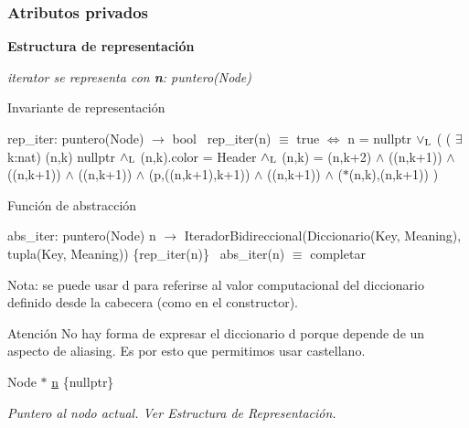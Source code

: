 \subsubsection*{Atributos privados}
\begin{Indent}{\bf Estructura de representación}\par
{\em iterator se representa con {\bfseries n}\+: puntero(\+Node)

\begin{DoxyParagraph}{Invariante de representación}

\end{DoxyParagraph}
rep\+\_\+iter\+: puntero(\+Node) $\to$ bool~\newline
rep\+\_\+iter(n) $\equiv$ true $\Leftrightarrow$ n = nullptr $\lor_{\rm L}$ ( ( $\exists$ k\+:nat) (n,k)  nullptr $\land_{\rm L}$ (n,k).color = Header $\land_{\rm L}$ (n,k) = (n,k+2) $\land$ ((n,k+1)) $\land$ ((n,k+1)) $\land$ ((n,k+1)) $\land$ (p,((n,k+1),k+1)) $\land$ ((n,k+1)) $\land$ ($\ast$(n,k),(n,k+1)) )

\begin{DoxyParagraph}{Función de abstracción}

\end{DoxyParagraph}
abs\+\_\+iter\+: puntero(\+Node) n $\to$ Iterador\+Bidireccional(Diccionario(Key, Meaning), tupla(Key, Meaning)) \{rep\+\_\+iter(n)\}~\newline
abs\+\_\+iter(n) $\equiv$ completar

Nota\+: se puede usar {\ttfamily d} para referirse al valor computacional del diccionario definido desde la cabecera (como en el constructor).

\begin{DoxyAttention}{Atención}
No hay forma de expresar el diccionario {\ttfamily d} porque depende de un aspecto de aliasing. Es por esto que permitimos usar castellano. 
\end{DoxyAttention}
}\begin{DoxyCompactItemize}
\item 
Node $\ast$ \hyperlink{classaed2_1_1map_1_1iterator_adf8633ef71bb6c1fc01c0abe8728fd93_adf8633ef71bb6c1fc01c0abe8728fd93}{n} \{nullptr\}
\begin{DoxyCompactList}\small\item\em Puntero al nodo actual. Ver Estructura de Representación. \end{DoxyCompactList}\end{DoxyCompactItemize}
\end{Indent}


